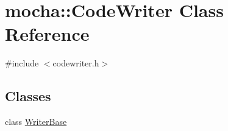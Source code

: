 \hypertarget{classmocha_1_1_code_writer}{
\section{mocha::CodeWriter Class Reference}
\label{classmocha_1_1_code_writer}
}


{\ttfamily \#include $<$codewriter.h$>$}

\subsection*{Classes}
\begin{DoxyCompactItemize}
\item 
class \hyperlink{classmocha_1_1_code_writer_1_1_writer_base}{WriterBase}
\end{DoxyCompactItemize}
